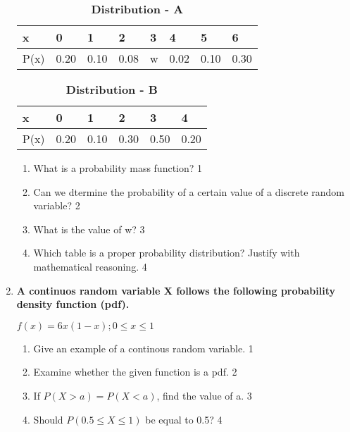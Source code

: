 \documentclass[a4paper,oneside, margin=1.4in]{book}
\begin{document}
\begin{enumerate}
	  \begin{table}[!ht]
	  \caption {\textbf{Distribution - A}}
	   \begin{center}
\begin{tabular}{llllllll}
x    & 0    & 1    & 2    & 3 & 4    & 5    & 6    \\  \hline
P(x) & 0.20 & 0.10 & 0.08 & w & 0.02 & 0.10 & 0.30
\end{tabular}
 \end{center}
\end{table}

\begin{table}[h]
	  \caption {\textbf{Distribution - B}}
	   \begin{center}
\begin{tabular}{llllll}
x    & 0    & 1    & 2    & 3    & 4 \\ \hline
P(x) & 0.20 & 0.10 & 0.30 & 0.50 & 0.20   
\end{tabular}
\end{center}
\end{table}
  
  \begin{enumerate}
    \item
	What is a probability mass function? \hfill 1
    \item
	Can we dtermine the probability of a certain value of a discrete random variable? \hfill 2
    \item  
	What is the value of w? \hfill 3
    \item
	Which table is a proper probability distribution? Justify with mathematical reasoning. \hfill 4
  \end{enumerate}
  
   \item
	  \textbf{A continuos random variable X follows the following probability density function (pdf).} 
	  \begin{center}
	  $f(x) = 6x(1-x); 0\le x\le 1$
  \end{center}
  
  \begin{enumerate}
    \item
	Give an example of a continous random variable. \hfill 1
    \item
	Examine whether the given function is a pdf. \hfill 2
    \item  
	If $P(X>a) = P(X<a)$, find the value of a. \hfill 3
    \item
	Should $P(0.5 \le X \le 1)$  be equal to 0.5? \hfill 4
  \end{enumerate}
  

\end{enumerate}
\end{document}
